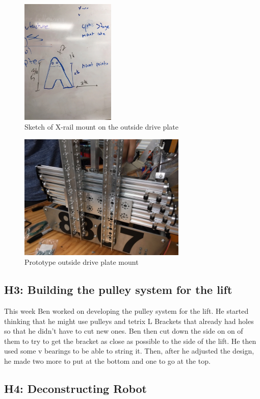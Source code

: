 \documentclass{article}
\begin{document}
\begin{figure}
    \centering
    \includegraphics[height=6cm]{16_12-17/images/x-rail_mount.JPG}
    \caption{Sketch of X-rail mount on the outside drive plate}
    \label{fig:Mount Sketch}
\end{figure}

\begin{figure}
    \centering
    \includegraphics[height=6cm]{16_12-17/images/mount_proto.JPG}
    \caption{Prototype outside drive plate mount}
    \label{Prototype Mount}
\end{figure}

\subsection{H3: Building the pulley system for the lift}

This week Ben worked on developing the pulley system for the lift. He started thinking that he might use pulleys and tetrix L Brackets that already had holes so that he didn't have to cut new ones. Ben then cut down the side on on of them to try to get the bracket as close as possible to the side of the lift. He then used some v bearings to be able to string it. Then, after he adjusted the design, he made two more to put at the bottom and one to go at the top.

\subsection{H4: Deconstructing Robot}
\end{document}

